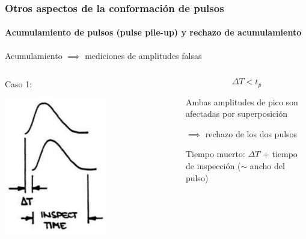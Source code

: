 \documentclass{beamer}
\begin{document}
\begin{frame}
\frametitle{Otros aspectos de la conformación de pulsos}
\framesubtitle{Acumulamiento de pulsos (pulse pile-up) y rechazo de acumulamiento} 
\begin{alertblock}{}
Acumulamiento $\implies$ mediciones de amplitudes falsas
\end{alertblock}
\begin{columns}
\begin{column}{0.50\textwidth}

\alert{Caso 1:}

\begin{center}
\includegraphics[width=0.6\textwidth]{d2/pileup_case1}
\end{center}

\end{column} 
\begin{column}{0.50\textwidth}
$$\Delta T < t_p$$

Ambas amplitudes de pico son afectadas por superposición 

$\implies$ rechazo de los dos pulsos

Tiempo muerto: $\Delta T$ + tiempo de inspección ($\sim$ ancho del pulso)
\end{column}
\end{columns}
\end{frame} 
\end{document}
